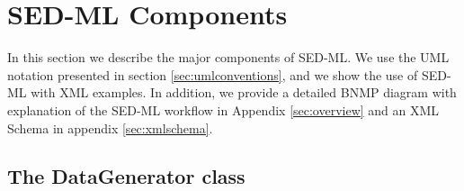
\section{SED-ML Components}
In this section we describe the major components of SED-ML. We use the UML notation presented in section \ref{sec:umlconventions}, and we show the use of SED-ML with XML examples. 
In addition, we provide a detailed BNMP diagram with explanation of the SED-ML workflow in Appendix \ref{sec:overview} and an XML Schema in appendix \ref{sec:xmlschema}. 

  

  



 

 

 


%

%

 


 \newpage
 \subsection[DataGenerator]{The DataGenerator class}
 

